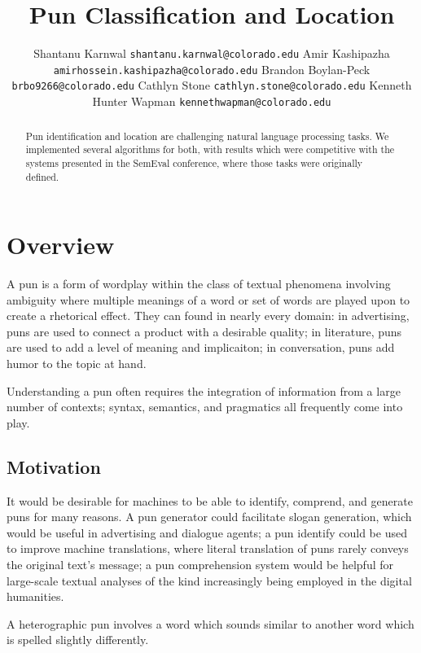 \documentclass{article}
\title{Pun Classification and Location}
\author{Shantanu Karnwal \texttt{shantanu.karnwal@colorado.edu}
	\And Amir Kashipazha \texttt{amirhossein.kashipazha@colorado.edu}
	\And Brandon Boylan-Peck \texttt{brbo9266@colorado.edu}
	\And Cathlyn Stone \texttt{cathlyn.stone@colorado.edu}
	\And Kenneth Hunter Wapman \texttt{kennethwapman@colorado.edu}
}
\begin{document}
\maketitle

\begin{abstract}
	Pun identification and location are challenging natural language processing 
	tasks. We implemented several algorithms for both, with results which 
	were competitive with the systems presented in the SemEval conference, where
	those tasks were originally defined.
\end{abstract}


\section{Overview}
A pun is a form of wordplay within the class of textual phenomena involving
ambiguity where multiple meanings of a word or set of words are played upon to
create a rhetorical effect. They can found in nearly every domain: in
advertising, puns are used to connect a product with a desirable quality; in
literature, puns are used to add a level of meaning and implicaiton; in
conversation, puns add humor to the topic at hand.

Understanding a pun often requires the integration of information from a large
number of contexts; syntax, semantics, and pragmatics all frequently come into
play. 

\subsection{Motivation}

It would be desirable for machines to be able to identify, comprend, and
generate puns for many reasons. A pun generator could facilitate slogan
generation, which would be useful in advertising and dialogue agents; a pun
identify could be used to improve machine translations, where literal
translation of puns rarely conveys the original text's message; a pun
comprehension system would be helpful for large-scale textual analyses of the
kind increasingly being employed in the digital humanities.

A heterographic pun involves a word which sounds similar to another word which
is spelled slightly differently.
\end{document}
